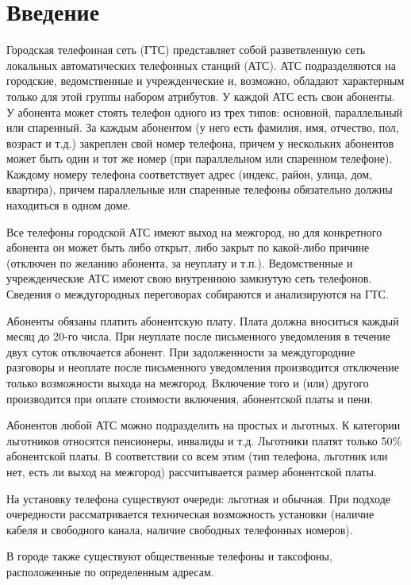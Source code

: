 \documentclass{report}
\begin{document}
\chapter{Введение}

Городская телефонная сеть (ГТС) представляет собой разветвленную сеть 
локальных автоматических телефонных станций (АТС). АТС подразделяются 
на городские, ведомственные и учрежденческие и, возможно, обладают 
характерным только для этой группы набором атрибутов. У каждой АТС есть 
свои абоненты. У абонента может стоять телефон одного из трех типов: 
основной, параллельный или спаренный. За каждым абонентом (у него есть 
фамилия, имя, отчество, пол, возраст и т.д.) закреплен свой номер телефона, 
причем у нескольких абонентов может быть один и тот же номер 
(при параллельном или спаренном телефоне). Каждому номеру телефона 
соответствует адрес (индекс, район, улица, дом, квартира), причем 
параллельные или спаренные телефоны обязательно должны находиться 
в одном доме.

Все телефоны городской АТС имеют выход на межгород, но для конкретного 
абонента он может быть либо открыт, либо закрыт по какой-либо причине 
(отключен по желанию абонента, за неуплату и т.п.). 
Ведомственные и учрежденческие АТС имеют свою внутреннюю замкнутую сеть 
телефонов. Сведения о междугородных переговорах 
собираются и анализируются на ГТС.

Абоненты обязаны платить абонентскую плату. Плата должна вноситься каждый 
месяц до 20-го числа. При неуплате после письменного уведомления в течение 
двух суток отключается абонент. При задолженности за междугородние 
разговоры и неоплате после письменного уведомления производится отключение 
только возможности выхода на межгород. Включение того и (или) другого 
производится при оплате стоимости включения, абонентской платы и пени.

Абонентов любой АТС можно подразделить на простых и льготных. К категории 
льготников относятся пенсионеры, инвалиды и т.д. Льготники платят только 
50\% абонентской платы. В соответствии со всем этим (тип телефона, льготник 
или нет, есть ли выход на межгород) рассчитывается размер абонентской платы.

На установку телефона существуют очереди: льготная и обычная. При подходе 
очередности рассматривается техническая возможность установки (наличие 
кабеля и свободного канала, наличие свободных телефонных номеров).

В городе также существуют общественные телефоны и таксофоны, расположенные 
по определенным адресам.
\end{document}
